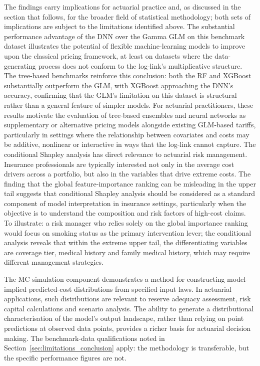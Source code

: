 The findings carry implications for actuarial practice and, as discussed
in the section that follows, for the broader field of statistical
methodology; both sets of implications are subject to the limitations
identified above.
The substantial performance advantage of the DNN over the Gamma GLM on
this benchmark dataset illustrates the potential of flexible
machine-learning models to improve upon the classical pricing framework,
at least on datasets where the data-generating process does not conform to
the log-link's multiplicative structure.  The tree-based benchmarks
reinforce this conclusion: both the RF and XGBoost
substantially outperform the GLM, with XGBoost approaching the DNN's
accuracy, confirming that the GLM's limitation on this dataset is
structural rather than a general feature of simpler models.  For
actuarial practitioners, these results motivate the evaluation of
tree-based ensembles and neural networks as supplementary or alternative
pricing models alongside existing GLM-based tariffs, particularly in
settings where the relationship between covariates and costs may be
additive, nonlinear or interactive in ways that the log-link cannot
capture.  The conditional Shapley analysis has direct relevance to
actuarial risk management.  Insurance professionals are typically
interested not only in the average cost drivers across a portfolio, but
also in the variables that drive extreme costs.  The finding that the
global feature-importance ranking can be misleading in the upper tail
suggests that conditional Shapley analysis should be considered as a
standard component of model interpretation in insurance settings,
particularly when the objective is to understand the composition and risk
factors of high-cost claims.  To illustrate: a risk manager who relies
solely on the global importance ranking would focus on smoking status as
the primary intervention lever; the conditional analysis reveals that
within the extreme upper tail, the differentiating variables are coverage
tier, medical history and family medical history, which may require
different management strategies.

The MC simulation component demonstrates a method for
constructing model-implied predicted-cost distributions from specified
input laws.  In actuarial applications, such distributions are relevant to
reserve adequacy assessment, risk capital calculations and scenario
analysis.  The ability to generate a distributional characterisation of
the model's output landscape, rather than relying on point predictions at
observed data points, provides a richer basis for actuarial decision
making.  The benchmark-data qualifications noted in
Section~\ref{sec:limitations_conclusion} apply: the methodology is
transferable, but the specific performance figures are not.

